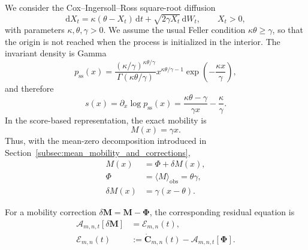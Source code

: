 \documentclass[11pt,twoside,fleqn]{article}
\renewcommand{\d}{\mathrm{d}}
\begin{document}
We consider the Cox--Ingersoll--Ross square-root diffusion \cite{CoxIngersollRoss1985,Feller1951}
\begin{equation}
    \d X_t
    =
    \kappa(\theta-X_t)\,\d t
    +
    \sqrt{2\gamma X_t}\,\d W_t,
    \qquad X_t>0,
    \label{eq:cir_sde_results}
\end{equation}
with parameters \(\kappa,\theta,\gamma>0\). We assume the usual Feller condition
\(\kappa\theta\geq \gamma\), so that the origin is not reached when the process is initialized in the interior. The invariant density is Gamma
\begin{equation}
    p_{\mathrm{ss}}(x)
    =
    \frac{
        \left(\kappa/\gamma\right)^{\kappa\theta/\gamma}
    }{
        \Gamma(\kappa\theta/\gamma)
    }
    x^{\kappa\theta/\gamma-1}
    \exp\!\left(-\frac{\kappa x}{\gamma}\right),
    \label{eq:cir_stationary_density_results}
\end{equation}
and therefore
\begin{equation}
    s(x)
    =
    \partial_x\log p_{\mathrm{ss}}(x)
    =
    \frac{\kappa\theta-\gamma}{\gamma x}
    -
    \frac{\kappa}{\gamma}.
    \label{eq:cir_stationary_score_results}
\end{equation}
In the score-based representation, the exact mobility is
\begin{equation}
    M(x)=\gamma x.
    \label{eq:cir_true_mobility_results}
\end{equation}
Thus, with the mean-zero decomposition introduced in
Section~\ref{subsec:mean_mobility_and_corrections},
\begin{equation}
\begin{aligned}
    M(x)
    &=
    \Phi+\delta M(x),
    \\
    \Phi
    &=
    \langle M\rangle_{\mathrm{obs}}=\theta\gamma,
    \\
    \delta M(x)
    &=
    \gamma(x-\theta).
\end{aligned}
    \label{eq:cir_mobility_decomposition_results}
\end{equation}

For a mobility
correction \(\delta\bm{M}=\bm{M}-\bm{\Phi}\), the corresponding residual
equation is
\begin{equation}
\begin{aligned}
    \mathcal{A}_{m,n,t}[\delta\bm{M}]
    &=
    \mathcal{E}_{m,n}(t),
    \\
    \mathcal{E}_{m,n}(t)
    &:=
    \dot{\bm{C}}_{m,n}(t)
    -
    \mathcal{A}_{m,n,t}[\bm{\Phi}].
\end{aligned}
    \label{eq:results_deltaM_residual}
\end{equation}
\end{document}
